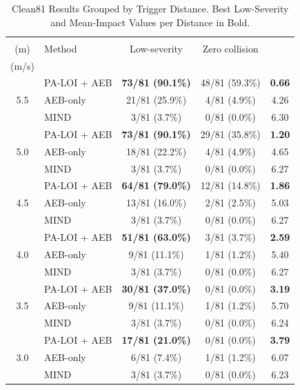 \begin{table}[t]
\caption{Clean81 Results Grouped by Trigger Distance. Best Low-Severity and Mean-Impact Values per Distance in Bold.}
\label{tab:distance-safety}
\centering
\footnotesize
\setlength{\tabcolsep}{3.5pt}
\begin{tabular}{clccc}
\toprule
\makecell{$d_{\mathrm{trig}}$\\(m)} & Method & Low-severity & Zero collision & \makecell{Mean $v_{\mathrm{imp}}$\\(m/s)} \\
\midrule
\multirow{3}{*}{5.5} & PA-LOI + AEB & \textbf{73/81 (90.1\%)} & 48/81 (59.3\%) & \textbf{0.66} \\
 & AEB-only & 21/81 (25.9\%) & 4/81 (4.9\%) & 4.26 \\
 & MIND & 3/81 (3.7\%) & 0/81 (0.0\%) & 6.30 \\
\midrule
\multirow{3}{*}{5.0} & PA-LOI + AEB & \textbf{73/81 (90.1\%)} & 29/81 (35.8\%) & \textbf{1.20} \\
 & AEB-only & 18/81 (22.2\%) & 4/81 (4.9\%) & 4.65 \\
 & MIND & 3/81 (3.7\%) & 0/81 (0.0\%) & 6.27 \\
\midrule
\multirow{3}{*}{4.5} & PA-LOI + AEB & \textbf{64/81 (79.0\%)} & 12/81 (14.8\%) & \textbf{1.86} \\
 & AEB-only & 13/81 (16.0\%) & 2/81 (2.5\%) & 5.03 \\
 & MIND & 3/81 (3.7\%) & 0/81 (0.0\%) & 6.27 \\
\midrule
\multirow{3}{*}{4.0} & PA-LOI + AEB & \textbf{51/81 (63.0\%)} & 3/81 (3.7\%) & \textbf{2.59} \\
 & AEB-only & 9/81 (11.1\%) & 1/81 (1.2\%) & 5.40 \\
 & MIND & 3/81 (3.7\%) & 0/81 (0.0\%) & 6.27 \\
\midrule
\multirow{3}{*}{3.5} & PA-LOI + AEB & \textbf{30/81 (37.0\%)} & 0/81 (0.0\%) & \textbf{3.19} \\
 & AEB-only & 9/81 (11.1\%) & 1/81 (1.2\%) & 5.70 \\
 & MIND & 3/81 (3.7\%) & 0/81 (0.0\%) & 6.24 \\
\midrule
\multirow{3}{*}{3.0} & PA-LOI + AEB & \textbf{17/81 (21.0\%)} & 0/81 (0.0\%) & \textbf{3.79} \\
 & AEB-only & 6/81 (7.4\%) & 1/81 (1.2\%) & 6.07 \\
 & MIND & 3/81 (3.7\%) & 0/81 (0.0\%) & 6.23 \\
\bottomrule
\end{tabular}
\end{table}
